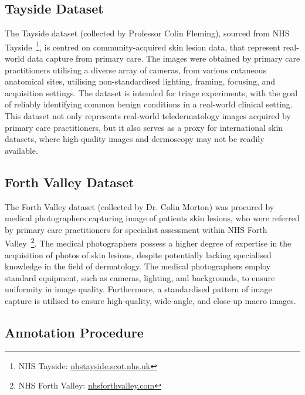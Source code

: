 \subsection{Tayside Dataset}
\label{subsec:tayside_dataset}
The Tayside dataset (collected by Professor Colin Fleming), sourced from NHS Tayside~\footnote{NHS Tayside: \url{nhstayside.scot.nhs.uk}}, is centred on community-acquired skin lesion data, that represent real-world data capture from primary care. The images were obtained by primary care practitioners utilising a diverse array of cameras, from various cutaneous anatomical sites, utilising non-standardised lighting, framing, focusing, and acquisition settings. The dataset is intended for triage experiments, with the goal of reliably identifying common benign conditions in a real-world clinical setting. This dataset not only represents real-world teledermatology images acquired by primary care practitioners, but it also serves as a proxy for international skin datasets, where high-quality images and dermoscopy may not be readily available.

\subsection{Forth Valley Dataset}
\label{subsec:forth_valley_dataset}
The Forth Valley dataset (collected by Dr. Colin Morton) was procured by medical photographers capturing image of patients skin lesions, who were referred by primary care practitioners for specialist assessment within NHS Forth Valley~\footnote{NHS Forth Valley: \url{nhsforthvalley.com}}. The medical photographers possess a higher degree of expertise in the acquisition of photos of skin lesions, despite potentially lacking specialised knowledge in the field of dermatology. The medical photographers employ standard equipment, such as cameras, lighting, and backgrounds, to ensure uniformity in image quality. Furthermore, a standardised pattern of image capture is utilised to ensure high-quality, wide-angle, and close-up macro images.

\subsection{Annotation Procedure}
\label{subsec:annotation_procedure}


